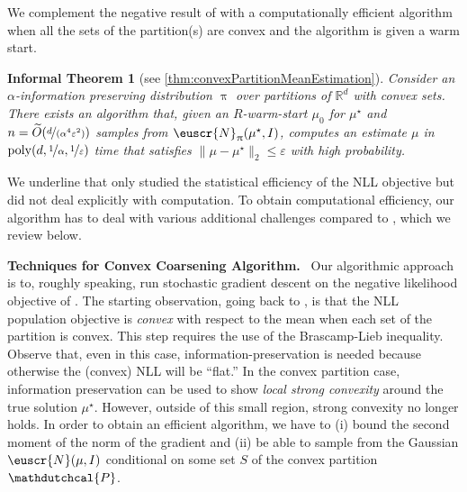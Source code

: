 \documentclass[11pt,letterpaper]{article}
\makeatletter
\theoremstyle{plain}
\newtheorem{inftheorem}{Informal Theorem}
\theoremstyle{definition}
\theoremstyle{remark}
\renewcommand{\eqref}[1]{\textup{\eqrefform@{\ref{#1}}}}
\let\eqrefform@\tagform@
\newcommand{\R}{\mathbb{R}}
\newcommand{\nfrac}[2]{\nicefrac{#1}{#2}}
\newcommand{\poly}{\mathrm{poly}}
\newcommand{\eps}{\varepsilon}
\renewcommand{\tilde}{\widetilde}
\newcommand{\customcal}[1]{\euscr{#1}}
\newcommand{\cN}{\customcal{N}}
\renewcommand{\paragraph}[1]{\medskip \noindent\textbf{#1}~}
\renewcommand{\pi}{\uppi}
\newcommand{\hypo}[1]{\mathdutchcal{#1}}
\newcommand{\hyP}{\hypo{P}}
\makeatother
\begin{document}
We complement the negative result of \cite{fotakis2021coarse} with a computationally efficient algorithm when all the sets of the partition(s) are convex and the algorithm is given a warm start.

\begin{inftheorem}[see \cref{thm:convexPartitionMeanEstimation}]
Consider an $\alpha$-information preserving distribution $\pi$ over partitions of $\R^d$ with convex sets.
There exists an algorithm that, given an $R$-warm-start $\mu_0$ for $\mu^\star$ and $n = \tilde O(\nfrac{d}{(\alpha^4 \eps^2)})$ samples from $\cN_\pi(\mu^\star, I)$, computes an estimate $\mu $ in $\poly(d,\nfrac{1}{\alpha},\nfrac{1}{\eps})$ time that satisfies $\|\mu - \mu^\star\|_2 \leq \eps$ with high probability.
\label{infthm:convex}
\end{inftheorem}
We underline that \cite{fotakis2021coarse} only studied the statistical efficiency of the NLL objective but did not deal explicitly with computation. 
{To obtain computational efficiency, our algorithm} has to deal with various additional challenges compared to \cite{fotakis2021coarse}, which we review below.

\paragraph{Techniques for Convex Coarsening Algorithm.}
Our algorithmic approach is to, roughly speaking, run stochastic gradient descent on the negative likelihood objective of \eqref{eq:NLL-intro}. The starting observation, going back to \cite{fotakis2021coarse}, is that the NLL population objective is \emph{convex} with respect to the mean when each set of the partition is convex. This step requires the use of the Brascamp-Lieb inequality.
Observe that, even in this case,
information-preservation is needed because otherwise the (convex) NLL will be ``flat.'' In the convex partition case, information preservation can be used to show \emph{local strong convexity} around the true solution $\mu^\star$. However, outside of this small region, strong convexity no longer holds. In order to obtain an efficient algorithm, we have to (i) bound the second moment of the norm of the gradient and (ii) be able to sample from the Gaussian $\cN(\mu, I)$ conditional on some set $S$ of the convex partition $\hyP$. 
\end{document}
